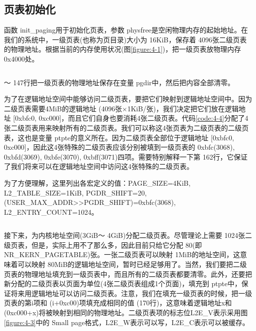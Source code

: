 \documentclass[main.tex]{subfiles}
\begin{document}
\begin{CJK*}{UTF8}{song}
\section{页表初始化}
函数 init\_\-paging用于初始化页表，参数 phys\-free是空闲物理内存的起始地址。在我们的系统中，一级页表(也称为页目录)大小为 16\-KiB，保存着 4096张二级页表的物理地址。根据当前的内存使用状况(图\ref{figure:4-1})，把一级页表放物理内存 0x4000处。

\begin{code}
\label{code:4-3}
\inputminted[firstline=145,lastline=157,linenos,numbersep=5pt,frame=lines,framesep=2mm]{c}{src/chapter04/kernel/machdep.c}
\end{code}

～ 147行把一级页表的物理地址保存在变量 pgdir中，然后把内容全部清零。

\par
为了在逻辑地址空间中能够访问二级页表，要把它们映射到逻辑地址空间中。因为二级页表需要4MiB的逻辑地址 (4096张$\times$1\-KiB/张)，我们决定把它们放在逻辑地址 [0xbfc0, 0xc000]，而且它们自身也要消耗4张二级页表。代码\ref{code:4-4}分配了4张二级页表用来映射所有的二级页表。我们可以称这4张页表为二级页表的二级页表，这也是变量 ptpte的意义所在。因为二级页表全部位于逻辑地址 [0xbfc0, 0xc000]，因此这4张特殊的二级页表应该分别被填到一级页表的 0xbfc(3068), 0xbfd(3069), 0xbfe(3070), 0xbff(3071)四项。需要特别解释一下第 162行，它保证了我们将来可以在逻辑地址空间中访问这4张特殊的二级页表。

\par
为了方便理解，这里列出各宏定义的值：PAGE\_\-SIZE=4\-KiB, L2\_\-TABLE\_\-SIZE=1\-KiB, PGDR\_\-SHIFT=20, (USER\_\-MAX\_\-ADDR\-\textgreater\textgreater\-PGDR\_\-SHIFT)=0xbfc(3068), L2\_\-ENTRY\_\-COUNT=1024。

\begin{code}
\label{code:4-4}
\inputminted[firstline=159,lastline=170,linenos,numbersep=5pt,frame=lines,framesep=2mm]{c}{src/chapter04/kernel/machdep.c}
\end{code}

接下来，为内核地址空间(3\-GiB～ 4\-GiB)分配二级页表。尽管理论上需要 1024张二级页表，但是，实际上用不了那么多，因此目前只给它分配 80(即 NR\_\-KERN\_\-PAGETABLE)张。一张二级页表可以映射 1\-MiB的地址空间，这意味着可以映射 80\-MiB的逻辑地址空间，暂时已经足够用了。当然，我们要把二级页表的物理地址填充到一级页表中，而且所有的二级页表都要清零。此外，还要把新分配的二级页表以页面为单位(4张二级页表组成1个页面)，填充到 ptpte中，保证将来用逻辑地址可以访问二级页表。注意，我们在填充一级页表的时候，把一级页表的第i项和 (i+0xc00)项填充成相同的值 (170行)，这意味着逻辑地址x和 (0xc000+x)将被映射到相同的物理地址。二级页表项的标志位L2E\_\-V表示采用图\ref{figure:4-3}中的 Small page格式，L2E\_\-W表示可以写，L2E\_\-C表示可以被缓存。


\end{CJK*}
\end{document}
